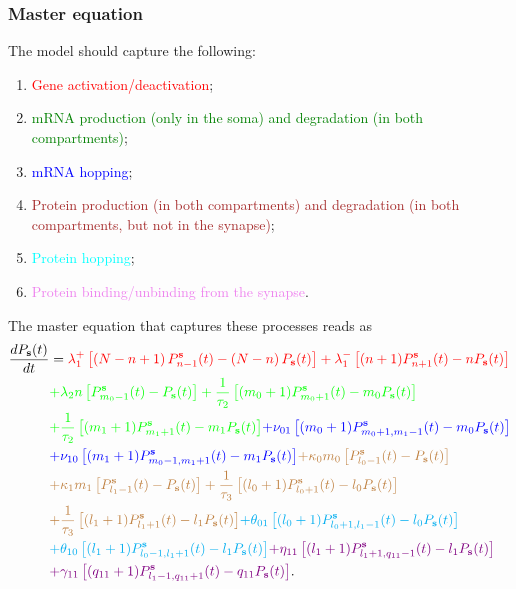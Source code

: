 \documentclass[a4paper, 11pt]{article}
\begin{document}
\subsubsection{Master equation}
The model should capture the following:
\begin{enumerate}
\item \textcolor{red}{Gene activation/deactivation};
\item \textcolor{green}{mRNA production (only in the soma) and degradation (in both compartments)};
\item \textcolor{blue}{mRNA hopping};
\item \textcolor{brown}{Protein production (in both compartments) and degradation (in both compartments, but not in the synapse)};
\item \textcolor{cyan}{Protein hopping};
\item \textcolor{violet}{Protein binding/unbinding from the synapse}.
\end{enumerate}
The master equation that captures these processes reads as
\begin{equation*}
  \begin{split}
    \frac{dP_{\mathbf s}(t)}{dt} &= \textcolor{red}{\lambda_1^+\left[\left(N-n+1\right)P_{n-1}^{\mathbf s}(t) - \left(N-n\right)P_{\mathbf s}(t)\right] + \lambda_1^-\left[(n+1)P^{\mathbf s}_{n+1}(t) - nP_{\mathbf s}(t)\right]}\\
    & \textcolor{green}{+ \lambda_2n\left[P^{\mathbf s}_{m_0-1}(t) - P_{\mathbf s}(t)\right] + \frac{1}{\tau_2}\left[(m_0+1)P^{\mathbf s}_{m_0+1}(t) - m_0P_{\mathbf s}(t)\right]}\\ &\textcolor{green}{+ \frac{1}{\tau_2}\left[(m_1+1)P^{\mathbf s}_{m_1+1}(t) - m_1P_{\mathbf s}(t)\right]} \textcolor{blue}{+ \nu_{01}\left[(m_0+1)P^{\mathbf s}_{m_0+1,m_1-1}(t) - m_0P_{\mathbf s}(t)\right]}\\
    &\textcolor{blue}{+ \nu_{10}\left[(m_1+1)P^{\mathbf s}_{m_0-1,m_1+1}(t) - m_1P_{\mathbf s}(t)\right]} \textcolor{brown}{+ \kappa_0m_0\left[P^{\mathbf s}_{l_0-1}(t) - P_{\mathbf s}(t)\right]}\\
    &\textcolor{brown}{+ \kappa_1m_1\left[P^{\mathbf s}_{l_1-1}(t) - P_{\mathbf s}(t)\right] + \frac{1}{\tau_3}\left[(l_0+1)P^{\mathbf s}_{l_0+1}(t) - l_0P_{\mathbf s}(t)\right]}\\&\textcolor{brown}{+ \frac{1}{\tau_3}\left[(l_1+1)P^{\mathbf s}_{l_1+1}(t)-l_1P_{\mathbf s}(t)\right]} \textcolor{cyan}{+ \theta_{01}\left[(l_0+1)P^{\mathbf s}_{l_0+1,l_1-1}(t) - l_0P_{\mathbf s}(t)\right]}\\
    &\textcolor{cyan}{+ \theta_{10}\left[(l_1+1)P^{\mathbf s}_{l_0-1,l_1+1}(t) - l_1P_{\mathbf s}(t)\right]} \textcolor{violet}{+\eta_{11}\left[(l_1+1)P^{\mathbf s}_{l_1+1, q_{11}-1}(t) - l_1P_{\mathbf s}(t)\right]} \\
    &\textcolor{violet}{+ \gamma_{11}\left[(q_{11}+1)P^{\mathbf s}_{l_1-1,q_{11}+1}(t) - q_{11}P_{\mathbf s}(t)\right]}.
  \end{split}
\end{equation*}
\end{document}
